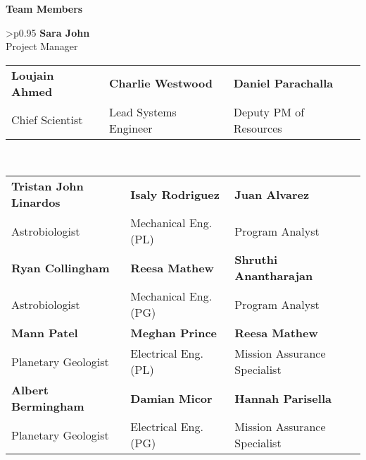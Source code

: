 \vspace{2em}

\noindent
\begin{center}
\begin{minipage}{\textwidth}
\centering

\vspace{1em}
\textbf{\Large Team Members}

\vspace{2em}

\begin{tabular}{>{\centering\arraybackslash}p{}}
\textbf{Sara John} \\ 
\small Project Manager \\
\begin{tabular}{>{\centering\arraybackslash}p{} >{\centering\arraybackslash}p{} >{\centering\arraybackslash}p{}}
\textbf{Loujain Ahmed} & \textbf{Charlie Westwood} & \textbf{Daniel Parachalla} \\
\small Chief Scientist & \small Lead Systems Engineer & \small Deputy PM of Resources \\
\end{tabular} \\[1em]
\begin{tabular}{>{\centering\arraybackslash}p{} >{\centering\arraybackslash}p{} >{\centering\arraybackslash}p{}}

\textbf{Tristan John Linardos} & \textbf{Isaly Rodriguez} & \textbf{Juan Alvarez} \\
\small Astrobiologist & \small Mechanical Eng. (PL) & \small Program Analyst \\

\textbf{Ryan Collingham} & \textbf{Reesa Mathew} & \textbf{Shruthi Anantharajan} \\
\small Astrobiologist & \small Mechanical Eng. (PG) & \small Program Analyst \\

\textbf{Mann Patel} & \textbf{Meghan Prince} & \textbf{Reesa Mathew} \\
\small Planetary Geologist & \small Electrical Eng. (PL) & \small Mission Assurance Specialist \\

\textbf{Albert Bermingham} & \textbf{Damian Micor} & \textbf{Hannah Parisella} \\
\small Planetary Geologist & \small Electrical Eng. (PG) & \small Mission Assurance Specialist \\


\end{tabular}
\end{tabular}
\end{minipage}
\end{center}
